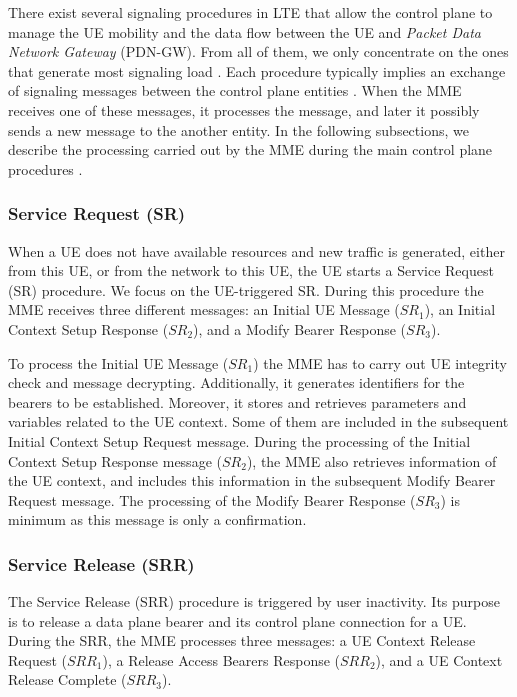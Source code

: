 \documentclass[conference]{IEEEtran}
\begin{document}
There exist several signaling procedures in LTE that allow the control plane to manage the UE mobility and the data flow between the UE and \emph{Packet Data Network Gateway} (PDN-GW). From all of them, we only concentrate on the ones that generate most signaling load \cite{Hirschman15}. Each procedure typically implies an exchange of signaling messages between the control plane entities \cite{lte-signaling}. When the MME receives one of these messages, it processes the message, and later it possibly sends a new message to the another entity. In the following subsections, we describe the processing carried out by the MME during the main control plane procedures \cite{lte-signaling}.

 
\subsubsection{Service Request (SR)}
 
When a UE does not have  available resources and new traffic is generated, either from this UE, or from the network to this UE, the UE starts a Service Request (SR) procedure. We focus on the UE-triggered SR. During this procedure the MME receives three different messages: an Initial UE Message ($SR_1$), an Initial Context Setup Response ($SR_2$), and a Modify Bearer Response ($SR_3$).



To process the Initial UE Message ($SR_1$) the MME has to carry out UE integrity check and message decrypting. Additionally, it generates identifiers for the bearers to be established. Moreover, it stores and retrieves parameters and variables related to the UE context. Some of them are included in the subsequent Initial Context Setup Request message. During the processing of the Initial Context Setup Response message ($SR_2$), the MME also retrieves information of the UE context, and includes this information in the subsequent Modify Bearer Request message. The processing of the Modify Bearer Response ($SR_3$) is minimum as this message is only a confirmation.

   
 
\subsubsection{Service Release (SRR)}
 
The Service Release (SRR) procedure is triggered by user inactivity. Its purpose is to release a data plane bearer and its control plane connection for a UE. During the SRR, the MME processes three messages: a UE Context Release Request ($SRR_1$), a Release Access Bearers Response ($SRR_2$), and a UE Context Release Complete ($SRR_3$).
  
\end{document}
